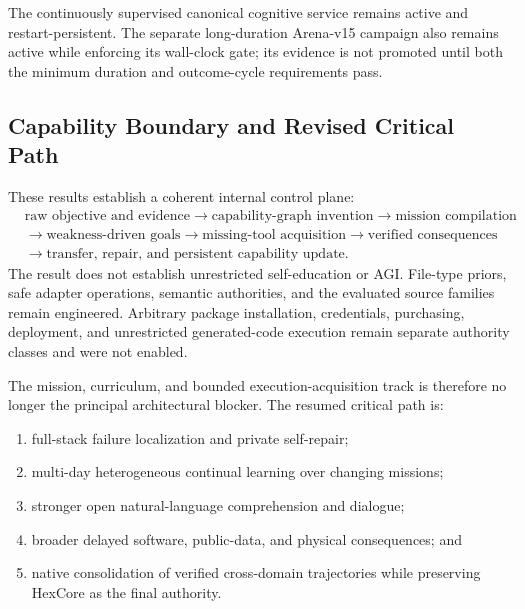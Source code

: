 The continuously supervised canonical cognitive service remains active and
restart-persistent.  The separate long-duration Arena-v15 campaign also remains
active while enforcing its wall-clock gate; its evidence is not promoted until
both the minimum duration and outcome-cycle requirements pass.

\subsection{Capability Boundary and Revised Critical Path}

These results establish a coherent internal control plane:
\begin{equation}
\begin{split}
&\text{raw objective and evidence}
\rightarrow \text{capability-graph invention}
\rightarrow \text{mission compilation}\\
&\rightarrow \text{weakness-driven goals}
\rightarrow \text{missing-tool acquisition}
\rightarrow \text{verified consequences}\\
&\rightarrow \text{transfer, repair, and persistent capability update}.
\end{split}
\end{equation}
The result does not establish unrestricted self-education or AGI.  File-type
priors, safe adapter operations, semantic authorities, and the evaluated source
families remain engineered.  Arbitrary package installation, credentials,
purchasing, deployment, and unrestricted generated-code execution remain
separate authority classes and were not enabled.

The mission, curriculum, and bounded execution-acquisition track is therefore no
longer the principal architectural blocker.  The resumed critical path is:
\begin{enumerate}
    \item full-stack failure localization and private self-repair;
    \item multi-day heterogeneous continual learning over changing missions;
    \item stronger open natural-language comprehension and dialogue;
    \item broader delayed software, public-data, and physical consequences; and
    \item native consolidation of verified cross-domain trajectories while
    preserving HexCore as the final authority.
\end{enumerate}
